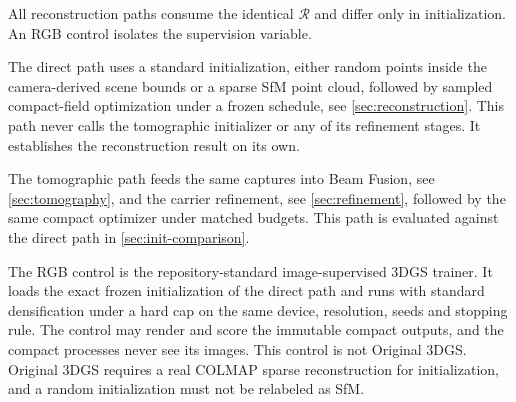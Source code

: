 \begin{figure}[t]
  \centering
  \caption{}
  \label{fig:teaser}
\end{figure}

All reconstruction paths consume the identical $\mathcal{R}$ and differ only in
initialization.  An RGB control isolates the supervision variable.

The direct path uses a standard initialization, either random points inside the
camera-derived scene bounds or a sparse SfM point cloud, followed by sampled compact-field
optimization under a frozen schedule, see \cref{sec:reconstruction}.  This path never
calls the tomographic initializer or any of its refinement stages.  It establishes the
reconstruction result on its own.

The tomographic path feeds the same captures into Beam Fusion, see \cref{sec:tomography},
and the carrier refinement, see \cref{sec:refinement}, followed by the same compact
optimizer under matched budgets.  This path is evaluated against the direct path in
\cref{sec:init-comparison}.

The RGB control is the repository-standard image-supervised 3DGS trainer.  It loads the
exact frozen initialization of the direct path and runs with standard densification under
a hard cap on the same device, resolution, seeds and stopping rule.  The control may
render and score the immutable compact outputs, and the compact processes never see its
images.  This control is not Original 3DGS.  Original 3DGS requires a real COLMAP sparse
reconstruction for initialization, and a random initialization must not be relabeled as
SfM.  

